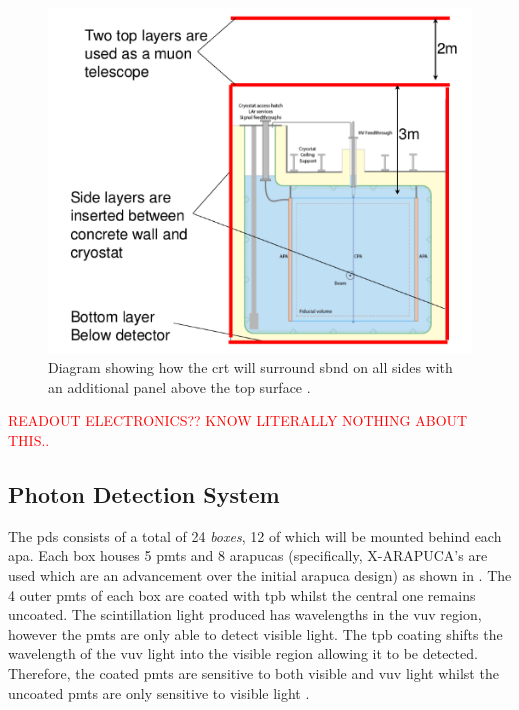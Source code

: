 \begin{figure}[!h]
    \centering
    \includegraphics[width = \largefigwidth]{figures-chap3/SBND_CRT.png}
    \caption[CRT positioning in SBND.]{Diagram showing how the \gls{crt} will surround \gls{sbnd} on all sides with an additional panel above the top surface \cite{SBN_Proposal}.}
    \label{fig:sbnd_crt}
\end{figure}

\textcolor{red}{READOUT ELECTRONICS?? KNOW LITERALLY NOTHING ABOUT THIS..}

\subsection*{Photon Detection System}
The \gls{pds} consists of a total of 24 \textit{boxes}, 12 of which will be mounted behind each \gls{apa}. Each box houses 5 \glspl{pmt} and 8 \glspl{arapuca} (specifically, X-ARAPUCA's are used which are an advancement over the initial \gls{arapuca} design) as shown in . The 4 outer \glspl{pmt} of each box are coated with \gls{tpb} whilst the central one remains uncoated. The scintillation light produced has wavelengths in the \gls{vuv} region, however the \glspl{pmt} are only able to detect visible light. The \gls{tpb} coating shifts the wavelength of the \gls{vuv} light into the visible region allowing it to be detected. Therefore, the coated \glspl{pmt} are sensitive to both visible and \gls{vuv} light whilst the uncoated \glspl{pmt} are only sensitive to visible light \cite{LArTPC_review}. 

